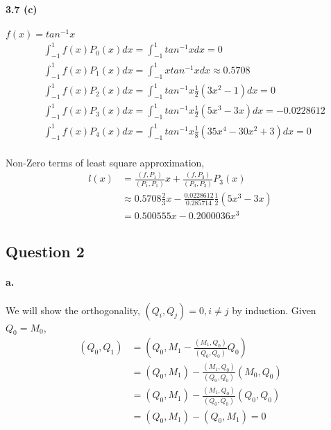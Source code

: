\documentclass{article}
\begin{document}
\paragraph{3.7 (c)} $f(x) = tan^{-1} x $
\begin{equation}
  \begin{split}
    &\int_{-1}^{1} f(x) P_0(x) dx = \int_{-1}^{1} tan^{-1}x dx  = 0 \\
    &\int_{-1}^{1} f(x) P_1(x) dx = \int_{-1}^{1} x tan^{-1}x  dx \approx 0.5708\\
    &\int_{-1}^{1} f(x) P_2(x) dx = \int_{-1}^{1} tan^{-1}x \frac{1}{2}(3 x ^2 - 1) dx = 0\\
    &\int_{-1}^{1} f(x) P_3(x) dx = \int_{-1}^{1} tan^{-1}x \frac{1}{2} (5 x^3 -3 x) dx = -0.0228612\\
    &\int_{-1}^{1} f(x) P_4(x) dx = \int_{-1}^{1} tan^{-1}x \frac{1}{8} (35 x^4 -30 x^2 + 3) dx =0 \\
  \end{split}
\end{equation}

Non-Zero terms of least square approximation,
\begin{equation}
  \begin{split}
    l(x) &= \frac{(f,P_1)}{(P_1,P_1)} x + \frac{(f,P_3)}{(P_3,P_3)} P_3 (x)\\
    &\approx 0.5708 \frac{2}{3} x - \frac{0.0228612}{0.285714} \frac{1}{2} (5 x^3 -3 x)\\
    &= 0.500555x - 0.2000036 x^3
  \end{split}
\end{equation}

\subsection*{ Question 2}
\paragraph{a.}
We will show the orthogonality, $(Q_i,Q_j)=0, i \neq j $ by induction.
Given $Q_0 = M_0$,
\begin{equation}
  \begin{split}
    (Q_0,Q_1) &= (Q_0, M_1 - \frac{(M_1, Q_0)}{(Q_0, Q_0)}Q_0)\\
    &= (Q_0, M_1) - \frac{(M_1, Q_0)}{(Q_0, Q_0)}(M_0,Q_0)\\
    &= (Q_0, M_1) - \frac{(M_1, Q_0)}{(Q_0, Q_0)}(Q_0,Q_0)\\
    &= (Q_0, M_1) - (Q_0, M_1) =0
  \end{split}
\end{equation}
\end{document}
